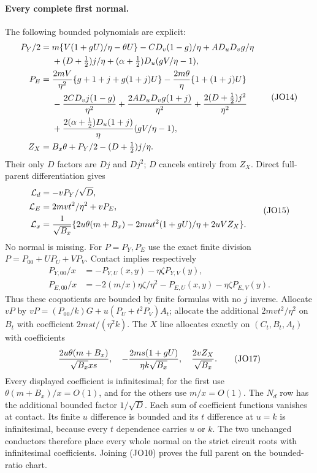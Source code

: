 \paragraph{Every complete first normal.}
The following bounded polynomials are explicit:
\[
 \begin{aligned}
 P_Y/2={}&m\{V(1+gU)/\eta-\theta U\}
       -C D_v(1-g)/\eta+A D_uD_vg/\eta\\
       &+(D+\tfrac12)j/\eta+
                  (\alpha+\tfrac12)D_u(gV/\eta-1),\\
 P_E={}&{2mV\over\eta^2}\{g+1+j+g(1+j)U\}
       -{2m\theta\over\eta}\{1+(1+j)U\}\\
       &-{2CD_vj(1-g)\over\eta^2}
        +{2AD_uD_vg(1+j)\over\eta^2}
        +{2(D+\tfrac12)j^2\over\eta^2}\\
       &+{2(\alpha+\tfrac12)D_u(1+j)\over\eta}
                                      (gV/\eta-1),\\
 Z_X={}&B_x\theta+P_Y/2-(D+\tfrac12)j/\eta .
 \end{aligned}                                                \tag{JO14}
\]
Their only $D$ factors are $Dj$ and $Dj^2$; $D$
cancels entirely from $Z_X$. Direct full-parent differentiation gives
\[
 \begin{aligned}
 \mathcal L_d&=-vP_Y/\sqrt D,\\
 \mathcal L_E&=2mvt^2/\eta^2+vP_E,\\
 \mathcal L_x&={1\over\sqrt{B_x}}
 \{2u\theta(m+B_x)-2mut^2(1+gU)/\eta+2uVZ_X\}.
 \end{aligned}                                                \tag{JO15}
\]
No normal is missing. For $P=P_Y,P_E$ use the exact finite
division $P=P_{00}+UP_U+VP_V$. Contact implies respectively
\[
 \begin{aligned}
 P_{Y,00}/x&=-P_{Y,U}(x,y)-\eta\zeta P_{Y,V}(y),\\
 P_{E,00}/x&=-2(m/x)\eta\zeta/\eta^2
                  -P_{E,U}(x,y)-\eta\zeta P_{E,V}(y).
 \end{aligned}                                                \tag{JO16}
\]
Thus these coquotients are bounded by finite formulas with no $j$
inverse. Allocate $vP$ by
$vP=(P_{00}/k)G+u(P_U+t^2P_V)A_t$; allocate the additional
$2mvt^2/\eta^2$ on $B_t$ with coefficient
$2mst/(\eta^2k)$. The $X$ line allocates exactly on $(C_t,B_t,A_t)$
with coefficients
\[
 {2u\theta(m+B_x)\over\sqrt{B_x}xs},\quad
 -{2ms(1+gU)\over\eta k\sqrt{B_x}},\quad
 {2vZ_X\over\sqrt{B_x}}.                               \tag{JO17}
\]
Every displayed coefficient is infinitesimal; for the first use
$\theta(m+B_x)/x=O(1)$, and for the others use $m/x=O(1)$.
The $N_d$ row has the additional bounded factor $1/\sqrt D$.
Each sum of coefficient functions vanishes at contact. Its finite
$u$ difference is bounded and its $t$ difference at $u=k$ is
infinitesimal, because every $t$ dependence carries $u$ or $k$.
The two unchanged conductors therefore place every whole normal on the
strict circuit roots with infinitesimal coefficients. Joining (JO10)
proves the full parent on the bounded-ratio chart.

